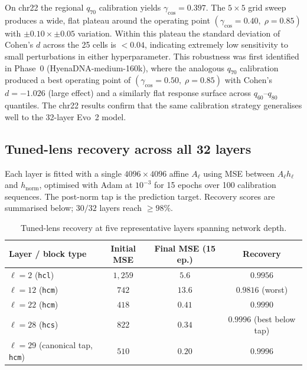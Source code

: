 \documentclass[12pt]{article}
\theoremstyle{plain}
\theoremstyle{definition}
\theoremstyle{remark}
\newcommand{\hnorm}{h_{\mathrm{norm}}}
\begin{document}
On chr22 the regional $q_{70}$ calibration yields
$\gamma_{\cos} = 0.397$. The $5\times 5$ grid sweep produces a wide,
flat plateau around the operating point
$(\gamma_{\cos}=0.40,\; \rho=0.85)$ with $\pm 0.10 \times \pm 0.05$
variation. Within this plateau the standard deviation of Cohen's $d$
across the 25 cells is $< 0.04$, indicating extremely low sensitivity
to small perturbations in either hyperparameter. This robustness was
first identified in Phase~0 (HyenaDNA-medium-160k), where the analogous
$q_{70}$ calibration produced a best operating point of
$(\gamma_{\cos}=0.50,\; \rho=0.85)$ with Cohen's $d = -1.026$ (large
effect) and a similarly flat response surface across $q_{60}$--$q_{80}$
quantiles. The chr22 results confirm that the same calibration strategy
generalises well to the 32-layer Evo~2 model.

\subsection{Tuned-lens recovery across all 32 layers}
\label{app:tuned-lens}

Each layer is fitted with a single $4096\times 4096$ affine $A_{\ell}$
using MSE between $A_{\ell} h_{\ell}$ and $\hnorm$, optimised with Adam
at $10^{-3}$ for 15 epochs over 100 calibration sequences. The
post-norm tap is the prediction target. Recovery scores are summarised
below; $30/32$ layers reach $\ge 98\%$.

\begin{table}[h]
\caption{Tuned-lens recovery at five representative layers spanning
network depth.}
\label{tab:tuned-lens}
\centering
\small
\begin{tabular}{@{}lccc@{}}
\toprule
Layer / block type & Initial MSE & Final MSE (15 ep.) & Recovery \\
\midrule
$\ell=2$ (\texttt{hcl}) & $1{,}259$ & $5.6$ & $0.9956$ \\
$\ell=12$ (\texttt{hcm}) & $742$ & $13.6$ & $0.9816$ (worst) \\
$\ell=22$ (\texttt{hcm}) & $418$ & $0.41$ & $0.9990$ \\
$\ell=28$ (\texttt{hcs}) & $822$ & $0.34$ & $0.9996$ (best below tap) \\
$\ell=29$ (canonical tap, \texttt{hcm}) & $510$ & $0.20$ & $0.9996$ \\
\bottomrule
\end{tabular}
\end{table}

\end{document}
